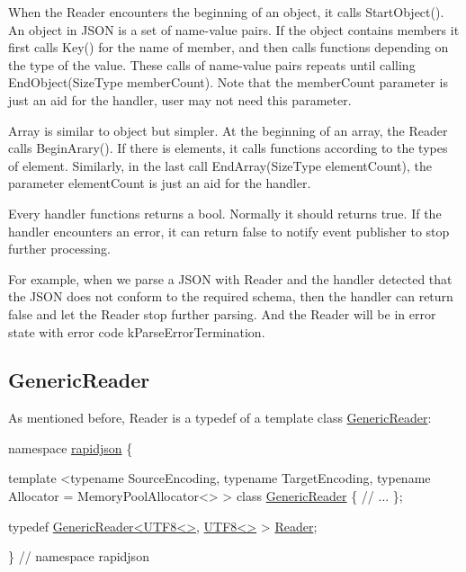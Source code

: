 When the {\ttfamily Reader} encounters the beginning of an object, it calls {\ttfamily Start\+Object()}. An object in J\+S\+ON is a set of name-\/value pairs. If the object contains members it first calls {\ttfamily Key()} for the name of member, and then calls functions depending on the type of the value. These calls of name-\/value pairs repeats until calling {\ttfamily End\+Object(\+Size\+Type member\+Count)}. Note that the {\ttfamily member\+Count} parameter is just an aid for the handler, user may not need this parameter.

Array is similar to object but simpler. At the beginning of an array, the {\ttfamily Reader} calls {\ttfamily Begin\+Arary()}. If there is elements, it calls functions according to the types of element. Similarly, in the last call {\ttfamily End\+Array(\+Size\+Type element\+Count)}, the parameter {\ttfamily element\+Count} is just an aid for the handler.

Every handler functions returns a {\ttfamily bool}. Normally it should returns {\ttfamily true}. If the handler encounters an error, it can return {\ttfamily false} to notify event publisher to stop further processing.

For example, when we parse a J\+S\+ON with {\ttfamily Reader} and the handler detected that the J\+S\+ON does not conform to the required schema, then the handler can return {\ttfamily false} and let the {\ttfamily Reader} stop further parsing. And the {\ttfamily Reader} will be in error state with error code {\ttfamily k\+Parse\+Error\+Termination}.\hypertarget{md_Cadriciel_Commun_Externe_RapidJSON_doc_sax.zh-cn_GenericReader}{}\subsection{Generic\+Reader}\label{md_Cadriciel_Commun_Externe_RapidJSON_doc_sax.zh-cn_GenericReader}
As mentioned before, {\ttfamily Reader} is a typedef of a template class {\ttfamily \hyperlink{class_generic_reader}{Generic\+Reader}}\+:


\begin{DoxyCode}
\textcolor{keyword}{namespace }\hyperlink{namespacerapidjson}{rapidjson} \{

\textcolor{keyword}{template} <\textcolor{keyword}{typename} SourceEncoding, \textcolor{keyword}{typename} TargetEncoding, \textcolor{keyword}{typename} Allocator = MemoryPoolAllocator<> >
\textcolor{keyword}{class }\hyperlink{class_generic_reader}{GenericReader} \{
    \textcolor{comment}{// ...}
\};

\textcolor{keyword}{typedef} \hyperlink{class_generic_reader}{GenericReader<UTF8<>}, \hyperlink{struct_u_t_f8}{UTF8<>} > \hyperlink{reader_8h_a84f3b66a66647f4ac4267078359188ba}{Reader};

\} \textcolor{comment}{// namespace rapidjson}
\end{DoxyCode}


